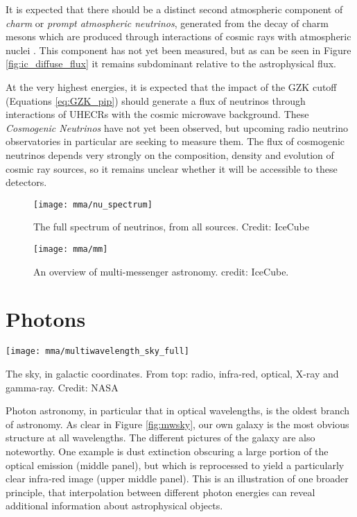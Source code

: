 It is expected that there should be a distinct second atmospheric component of \emph{charm} or \emph{prompt atmospheric neutrinos}, generated from the decay of charm mesons which are produced through interactions of cosmic rays with atmospheric nuclei \cite{spurio_18}. This component has not yet been measured, but as can be seen in Figure \ref{fig:ic_diffuse_flux} it remains subdominant relative to the astrophysical flux.

At the very highest energies, it is expected that the impact of the GZK cutoff (Equations \ref{eq:GZK_pip}) should generate a flux of neutrinos through interactions of UHECRs with the cosmic microwave background. These \emph{Cosmogenic Neutrinos} have not yet been observed, but upcoming radio neutrino observatories in particular are seeking to measure them. The flux of cosmogenic neutrinos depends very strongly on the composition, density and evolution of cosmic ray sources, so it remains unclear whether it will be accessible to these detectors.

\begin{figure}[!ht]
	\texttt{[image: mma/nu\_spectrum]}
	\caption{The full spectrum of neutrinos, from all sources. Credit: IceCube}
	\label{fig:nu_spectrum}
\end{figure}

\begin{figure}[!ht]
	\centering \texttt{[image: mma/mm]}
	\caption{An overview of multi-messenger astronomy. credit: IceCube.}
	\label{fig:mm}
\end{figure}

\section{Photons}

\begin{marginfigure}
	\texttt{[image: mma/multiwavelength\_sky\_full]}
	\caption{The sky, in galactic coordinates. From top: radio, infra-red, optical, X-ray and gamma-ray. Credit: NASA}
	\label{fig:mwsky}
\end{marginfigure}

Photon astronomy, in particular that in optical wavelengths, is the oldest branch of astronomy. As clear in Figure \ref{fig:mwsky}, our own galaxy is the most obvious structure at all wavelengths. The different pictures of the galaxy are also noteworthy. One example is dust extinction obscuring a large portion of the optical emission (middle panel), but  which is reprocessed to yield a particularly clear infra-red image (upper middle panel). This is an illustration of one broader principle, that interpolation between different photon energies can reveal additional information about astrophysical objects.

